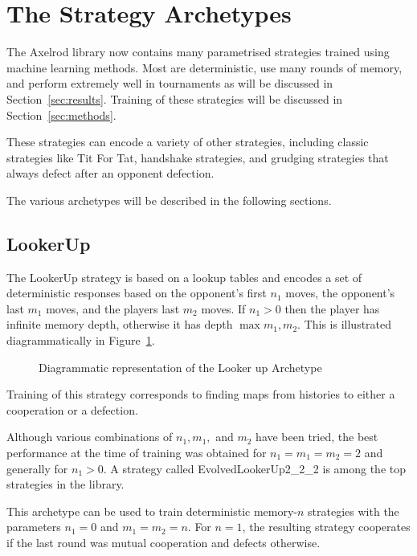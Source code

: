 \documentclass{article}
\begin{document}
\section{The Strategy Archetypes}

The Axelrod library now contains many parametrised strategies trained using
machine learning
methods. Most are deterministic, use many rounds of memory, and perform
extremely well in tournaments as will be discussed in Section~\ref{sec:results}.
Training of these strategies will be discussed in Section~\ref{sec:methods}.

These strategies can encode a variety
of other strategies, including classic strategies like Tit For Tat,
handshake strategies, and grudging strategies that always defect after
an opponent defection.

The various archetypes will be described in the following sections.

\subsection{LookerUp}

The LookerUp strategy is based on a lookup tables and  encodes a set of
deterministic responses based on the opponent's first $n_1$ moves, the
opponent's last $m_1$ moves, and the players last $m_2$ moves. If $n_1 > 0$ then
the player has infinite memory depth, otherwise it has depth $\max{m_1, m_2}$.
This is illustrated diagrammatically in Figure~\ref{fig:lookerup}.

\begin{figure}[!hbtp]
    \centering
    
    \caption{Diagrammatic representation of the Looker up Archetype}
    \label{fig:lookerup}
\end{figure}

Training of this strategy corresponds to finding maps from histories to either a
cooperation or a defection.

Although various
combinations of $n_1, m_1,$ and $m_2$ have been tried, the best performance at
the time of
training was obtained for $n_1 = m_1 = m_2 = 2$ and generally for $n_1 > 0$.
A strategy
called EvolvedLookerUp2\_2\_2 is among the top strategies in the library.

This archetype can be used to train deterministic memory-$n$ strategies with the
parameters $n_1=0$ and $m_1=m_2=n$. For $n=1$, the resulting strategy cooperates
if the last round was mutual cooperation and defects otherwise.
\end{document}
